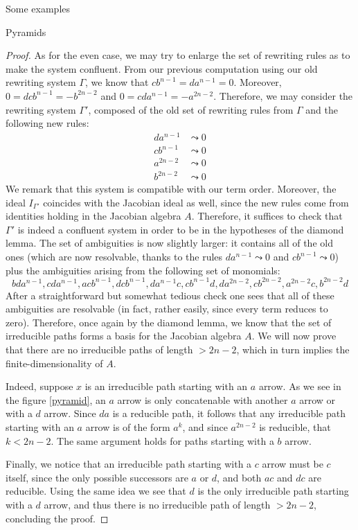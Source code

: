 \begin{chapter}{Some examples}
\begin{section}{Pyramids}
\begin{proof}
As for the even case, we may try to enlarge the set of rewriting rules as to make the system confluent. From our previous computation using our old rewriting system $\Gamma$, we know that $cb^{n-1}=da^{n-1}=0$. Moreover,  $0=dcb^{n-1}=-b^{2n-2}$ and  $0=cda^{n-1}=-a^{2n-2}$. Therefore, we may consider the rewriting system $\Gamma'$, composed of the old set of rewriting rules from $\Gamma$ and the following new rules:
\begin{align*}
da^{n-1} &\leadsto 0 \\
cb^{n-1} &\leadsto 0\\
a^{2n-2} &\leadsto 0\\
b^{2n-2} &\leadsto 0
\end{align*}
We remark that this system is compatible with our term order. Moreover, the ideal $I_{\Gamma'}$ coincides with the Jacobian ideal as well, since the new rules come from identities holding in the Jacobian algebra $A$. Therefore, it suffices to check that $\Gamma'$ is indeed a confluent system in order to be in the hypotheses of the diamond lemma. The set of ambiguities is now slightly larger: it contains all of the old ones (which are now resolvable, thanks to the rules $da^{n-1} \leadsto 0$ and $cb^{n-1} \leadsto 0$) plus the ambiguities arising from the following set of monomials:
\[bda^{n-1}, cda^{n-1}, acb^{n-1}, dcb^{n-1}, da^{n-1}c, cb^{n-1}d, da^{2n-2}, cb^{2n-2}, a^{2n-2}c, b^{2n-2}d\]
After a straightforward but somewhat tedious check one sees that all of these ambiguities are resolvable (in fact, rather easily, since every term reduces to zero). Therefore, once again by the diamond lemma, we know that the set of irreducible paths forms a basis for the Jacobian algebra $A$. We will now prove that there are no irreducible paths of length $>2n-2$, which in turn implies the finite-dimensionality of $A$.

Indeed, suppose $x$ is an irreducible path starting with an $a$ arrow. As we see in the figure \ref{pyramid}, an $a$ arrow is only concatenable with another $a$ arrow or with a $d$ arrow. Since $da$ is a reducible path, it follows that any irreducible path starting with an $a$ arrow is of the form $a^k$, and since $a^{2n-2}$ is reducible, that $k<2n-2$. The same argument holds for paths starting with a $b$ arrow.

Finally, we notice that an irreducible path starting with a $c$ arrow must be $c$ itself, since the only possible successors are $a$ or $d$, and both $ac$ and $dc$ are reducible. Using the same idea we see that $d$ is the only irreducible path starting with a $d$ arrow, and thus there is no irreducible path of length $>2n-2$, concluding the proof.
\end{proof}
\end{section}
\end{chapter}